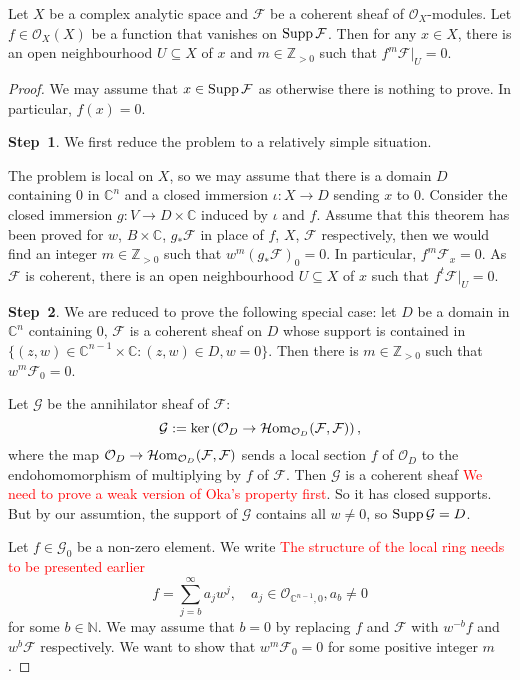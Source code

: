 \begin{theorem}
    Let $X$ be a complex analytic space and $\mathcal{F}$ be a coherent sheaf of $\mathcal{O}_X$-modules. Let $f\in \mathcal{O}_X(X)$ be a function that vanishes on $\operatorname{Supp} \mathcal{F}$. Then for any $x\in X$, there is an open neighbourhood $U\subseteq X$ of $x$ and $m\in \mathbb{Z}_{>0}$ such that $f^m\mathcal{F}|_U=0$.
\end{theorem}
\begin{proof}
    We may assume that $x\in \operatorname{Supp} \mathcal{F}$ as otherwise there is nothing to prove. In particular, $f(x)=0$.

    \textbf{Step~1}. We first reduce the problem to a relatively simple situation.

    The problem is local on $X$, so we may assume that there is a domain $D$ containing $0$ in $\mathbb{C}^n$ and a closed immersion $\iota:X\rightarrow D$ sending $x$ to $0$. Consider the closed immersion $g:V\rightarrow D\times \mathbb{C}$ induced by $\iota$ and $f$. Assume that this theorem has been proved for $w$, $B\times \mathbb{C}$, $g_*\mathcal{F}$ in place of $f$, $X$, $\mathcal{F}$ respectively, then we would find an integer $m\in \mathbb{Z}_{>0}$ such that $w^m(g_*\mathcal{F})_0=0$. In particular, $f^m\mathcal{F}_x=0$. As $\mathcal{F}$ is coherent, there is an open neighbourhood $U\subseteq X$ of $x$ such that $f^t\mathcal{F}|_U=0$.

    \textbf{Step~2}. We are reduced to prove the following special case: let $D$ be a domain in $\mathbb{C}^n$ containing $0$, $\mathcal{F}$ is a coherent sheaf on $D$ whose support is contained in $\{(z,w)\in \mathbb{C}^{n-1}\times \mathbb{C}:(z,w)\in D,w=0\}$. Then there is $m\in \mathbb{Z}_{>0}$ such that $w^m\mathcal{F}_0=0$.

    Let $\mathcal{G}$ be the annihilator sheaf of $\mathcal{F}$: 
    \[
       \mathcal{G}:=\ker \left(\mathcal{O}_D\rightarrow \operatorname{\mathcal{H}\mathrm{om}}_{\mathcal{O}_D}(\mathcal{F},\mathcal{F})\right),
    \]
    where the map $\mathcal{O}_D\rightarrow \operatorname{\mathcal{H}\mathrm{om}}_{\mathcal{O}_D}(\mathcal{F},\mathcal{F})$ sends a local section $f$ of $\mathcal{O}_D$ to the endohomomorphism of multiplying by $f$ of $\mathcal{F}$.
    Then $\mathcal{G}$ is a coherent sheaf \textcolor{red}{We need to prove a weak version of Oka's property first}. So it has closed supports. But by our assumtion, the support of $\mathcal{G}$ contains all $w\neq 0$, so $\operatorname{Supp} \mathcal{G}=D$.

    Let $f\in \mathcal{G}_0$ be a non-zero element. We write \textcolor{red}{The structure of the local ring needs to be presented earlier}
    \[
      f=\sum_{j=b}^{\infty}a_jw^j,\quad a_j\in \mathcal{O}_{\mathbb{C}^{n-1},0},a_b\neq 0
    \]
    for some $b\in \mathbb{N}$.
    We may assume that $b=0$ by replacing $f$ and $\mathcal{F}$ with $w^{-b}f$ and  $w^b\mathcal{F}$ respectively. We want to show that $w^m\mathcal{F}_0=0$ for some positive integer $m$. 
    

\end{proof}
